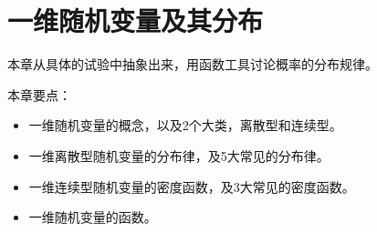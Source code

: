 \chapter{一维随机变量及其分布}

本章从具体的试验中抽象出来，用函数工具讨论概率的分布规律。

本章要点：
\begin{itemize}
    \item 一维随机变量的概念，以及2个大类，离散型和连续型。
    \item 一维离散型随机变量的分布律，及5大常见的分布律。
    \item 一维连续型随机变量的密度函数，及3大常见的密度函数。
    \item 一维随机变量的函数。
\end{itemize}

\newpage


\newpage


\newpage


\newpage


\newpage


\newpage





